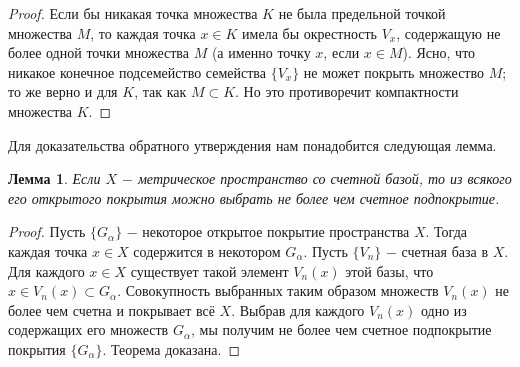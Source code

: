 \documentclass{article}
\newtheorem*{lemma}{Лемма}
\begin{document}
\begin{proof}
Если бы никакая точка множества \(K\) не была предельной точкой множества \(M\), то каждая точка \(x \in K\) имела бы окрестность \(V_x\), содержащую не более одной точки множества \(M\) (а именно точку \(x\), если \(x \in M\)). Ясно, что никакое конечное подсемейство семейства \(\{V_x\}\) не может покрыть множество \(M\); то же верно и для \(K\), так как \(M \subset K\). Но это противоречит компактности множества \(K\).
\end{proof}

Для доказательства обратного утверждения нам понадобится следующая лемма.

\begin{lemma}
Если \(X\) \(-\) метрическое пространство со счетной базой, то из всякого его открытого покрытия можно выбрать не более чем счетное подпокрытие.
\end{lemma}

\begin{proof}
Пусть \(\{G_\alpha\}\) \(-\) некоторое открытое покрытие пространства \(X\). Тогда каждая точка \(x \in X\) содержится в некотором \(G_\alpha\). Пусть \(\{V_n\}\) \(-\) счетная база в \(X\). Для каждого \(x \in X\) существует такой элемент \(V_n(x)\) этой базы, что \(x \in V_n(x) \subset G_\alpha\). Совокупность выбранных таким образом множеств \(V_n(x)\) не более чем счетна и покрывает всё \(X\). Выбрав для каждого \(V_n(x)\) одно из содержащих его множеств \(G_\alpha\), мы получим не более чем счетное подпокрытие покрытия \(\{G_\alpha\}\). Теорема доказана.
\end{proof}
\end{document}
